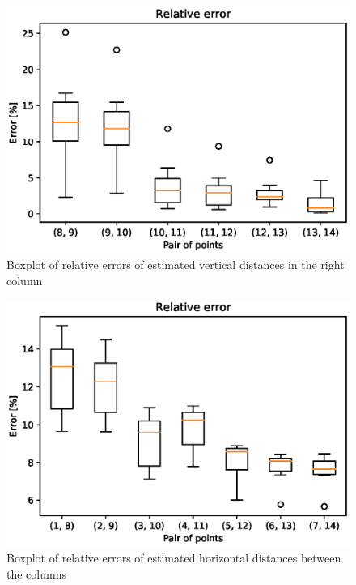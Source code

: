 \begin{figure}
\includegraphics[width=\linewidth]{experiments/rightcolumn.eps}
\caption{Boxplot of relative errors of estimated vertical distances in the right column}
\label{fig:verticalright-boxplot}
\end{figure}

\begin{figure}
\includegraphics[width=\linewidth]{experiments/horizontal.eps}
\caption{Boxplot of relative errors of estimated horizontal distances between the columns}
\label{fig:horizontal-boxplot}
\end{figure}
